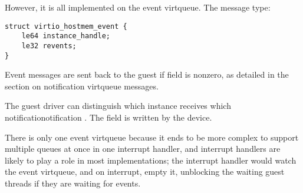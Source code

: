 However, it is all implemented on the event virtqueue. The message type:

\begin{lstlisting}
struct virtio_hostmem_event {
    le64 instance_handle;
    le32 revents;
}
\end{lstlisting}

Event messages are sent back to the guest if  field is nonzero,
as detailed in the section on notification virtqueue messages.

The guest driver can distinguish which instance receives which notificationotification
.
The field  is written by the device.

There is only one event virtqueue because it ends to be more complex to support
multiple queues at once in one interrupt handler,
and interrupt handlers are likely to play a role in most implementations;
the interrupt handler would watch the event virtqueue,
and on interrupt, empty it, unblocking the waiting guest threads if they are
waiting for events.
